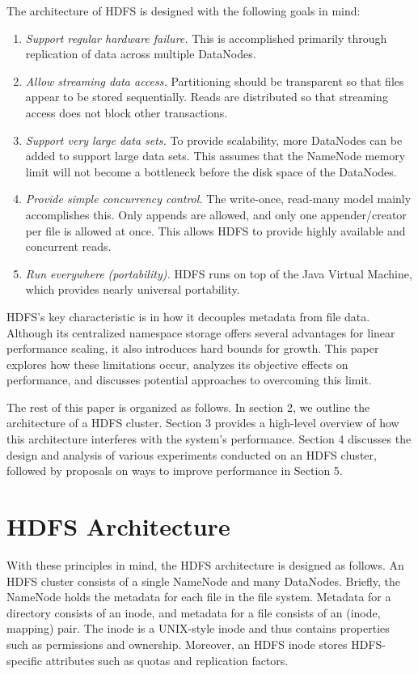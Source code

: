 \documentclass[11pt, a4paper]{article}
\begin{document}
\begin{multicols*}{2}
The architecture of HDFS is designed with the following goals in mind:
\begin{enumerate}[noitemsep, label=\arabic*.]
	\item\textit{Support regular hardware failure.} This is accomplished primarily through replication of data across multiple DataNodes.
	\item\textit{Allow streaming data access.} Partitioning should be transparent so that files appear to be stored sequentially. Reads are distributed so that streaming access does not block other transactions.
	\item\textit{Support very large data sets.} To provide scalability, more DataNodes can be added to support large data sets. This assumes that the NameNode memory limit will not become a bottleneck before the disk space of the DataNodes.
	\item\textit{Provide simple concurrency control.} The write-once, read-many model mainly accomplishes this. Only appends are allowed, and only one appender/creator per file is allowed at once. This allows HDFS to provide highly available and concurrent reads.
	\item\textit{Run everywhere (portability).} HDFS runs on top of the Java Virtual Machine, which provides nearly universal portability.
\end{enumerate}

HDFS's key characteristic is in how it decouples metadata from file data. Although its centralized namespace storage offers several advantages for linear performance scaling, it also introduces hard bounds for growth. This paper explores how these limitations occur, analyzes its objective effects on performance, and discusses potential approaches to overcoming this limit.

The rest of this paper is organized as follows. In section 2, we outline the architecture of a HDFS cluster. Section 3 provides a high-level overview of how this architecture interferes with the system's performance. Section 4 discusses the design and analysis of various experiments conducted on an HDFS cluster, followed by proposals on ways to improve performance in Section 5.

\section{HDFS Architecture}

With these principles in mind, the HDFS architecture is designed as follows. An HDFS cluster consists of a single NameNode and many DataNodes. Briefly, the NameNode holds the metadata for each file in the file system. Metadata for a directory consists of an inode, and metadata for a file consists of an (inode, mapping) pair. The inode is a UNIX-style inode and thus contains properties such as permissions and ownership. Moreover, an HDFS inode stores HDFS-specific attributes such as quotas and replication factors.


\end{multicols*}
\end{document}
